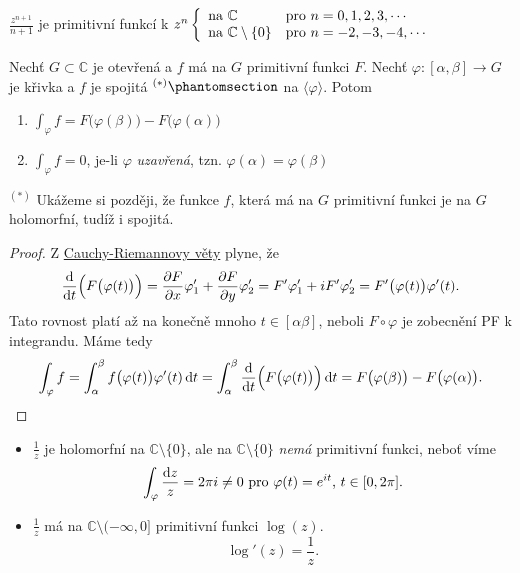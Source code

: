\begin{example}
$\frac{z^{n+1}}{n+1}$ je primitivní funkcí k $z^n
\left\{ \begin{array}{ll} \text{na } \mathbb{C} & \mbox{pro } n=0,1,2,3, \cdots \\ \text{na } \mathbb{C}\setminus\{0\} & \mbox{pro } n=-2,-3,-4, \cdots \end{array} \right.$
\end{example}

\begin{theorem}
Nechť $G\subset\mathbb{C}$ je otevřená a $f$ má na $G$ primitivní funkci $F$. Nechť $\varphi:[\alpha,\beta]\rightarrow G$ je křivka a $f$ je spojitá $^{(*)}\phantomsection \label{^{(*)}}$ na $\langle\varphi\rangle$. Potom
\begin{enumerate}
    \item $\int_\varphi f=F\bigl(\varphi(\beta)\bigr)-F\bigl(\varphi(\alpha)\bigr)$
    \item $\int_\varphi f=0$, je-li $\varphi$ \emph{uzavřená}, tzn. $\varphi(\alpha)=\varphi(\beta)$
\end{enumerate}
\end{theorem}
\begin{note}
\hyperref[^{(*)}]{$^{(*)}$} Ukážeme si později, že funkce $f$, která má na $G$ primitivní funkci je na $G$ holomorfní, tudíž i spojitá.
\end{note}

\begin{proof}
Z \hyperref[CR]{Cauchy-Riemannovy věty} plyne, že 
$$\frac{\mathop{}\!\mathrm{d}}{\mathop{}\!\mathrm{d} t}\Bigl(F\bigl(\varphi(t)\bigr)\Bigr)=\frac{\partial F}{\partial x}\varphi'_1+\frac{\partial F}{\partial y}\varphi'_2=F'\varphi'_1+iF'\varphi'_2=F'\bigl(\varphi(t)\bigr)\varphi'(t)\text{.}$$
Tato rovnost platí až na konečně mnoho $t\in[\alpha\beta]$, neboli $F\circ\varphi$ je zobecnění PF k integrandu.
Máme tedy
$$\int_\varphi f=\int_\alpha^\beta f\bigl(\varphi(t)\bigr)\varphi'(t)\mathop{}\!\mathrm{d} t
=\int_\alpha^\beta \frac{\mathop{}\!\mathrm{d}}{\mathop{}\!\mathrm{d} t}\Bigl(F\bigl(\varphi(t)\bigr)\Bigr)\mathop{}\!\mathrm{d} t=
F\bigl(\varphi(\beta)\bigr)-F\bigl(\varphi(\alpha)\bigr)\text{.}$$
\end{proof}

\begin{example}
\mbox{}
\begin{itemize}
    \item $\frac{1}{z}$ je holomorfní na $\mathbb{C}\setminus\{0\}$, ale na $\mathbb{C}\setminus\{0\}$ \emph{nemá} primitivní funkci, neboť víme $$\int_\varphi \frac{\mathop{}\!\mathrm{d} z}{z}=2\pi i \neq 0 \text{ pro } \varphi(t)=e^{it}\text{, } t \in [0,2\pi]\text{.}$$ 
    \item $\frac{1}{z}$ má na $\mathbb{C}\setminus(-\infty,0]$ primitivní funkci $\log(z)$. $$\log'(z)=\frac{1}{z}\text{.}$$
\end{itemize}
\end{example}

